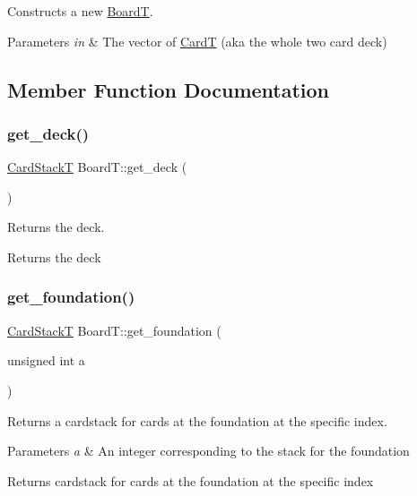 Constructs a new \mbox{\hyperlink{class_board_t}{BoardT}}. 


\begin{DoxyParams}{Parameters}
{\em in} & The vector of \mbox{\hyperlink{struct_card_t}{CardT}} (aka the whole two card deck) \\
\hline
\end{DoxyParams}


\subsection{Member Function Documentation}
\mbox{\label{class_board_t_a2f28e0a5e9c34f396e2aebc79342a225}} 
\subsubsection{\texorpdfstring{get\_deck()}{get\_deck()}}
{\footnotesize\ttfamily \mbox{\hyperlink{_card_stack_8h_a29a6854caf5fec306ee8fc0c6b453837}{Card\+StackT}} Board\+T\+::get\+\_\+deck (\begin{DoxyParamCaption}{ }\end{DoxyParamCaption})}



Returns the deck. 

\begin{DoxyReturn}{Returns}
the deck 
\end{DoxyReturn}
\mbox{\label{class_board_t_a5167cf5c067a7f4601ed011d329c9846}} 
\subsubsection{\texorpdfstring{get\_foundation()}{get\_foundation()}}
{\footnotesize\ttfamily \mbox{\hyperlink{_card_stack_8h_a29a6854caf5fec306ee8fc0c6b453837}{Card\+StackT}} Board\+T\+::get\+\_\+foundation (\begin{DoxyParamCaption}\item[{unsigned int}]{a }\end{DoxyParamCaption})}



Returns a cardstack for cards at the foundation at the specific index. 


\begin{DoxyParams}{Parameters}
{\em a} & An integer corresponding to the stack for the foundation \\
\hline
\end{DoxyParams}
\begin{DoxyReturn}{Returns}
cardstack for cards at the foundation at the specific index 
\end{DoxyReturn}
\mbox{\label{class_board_t_a70509bcb23b26d594aff5d2f9b81cab3}} 
